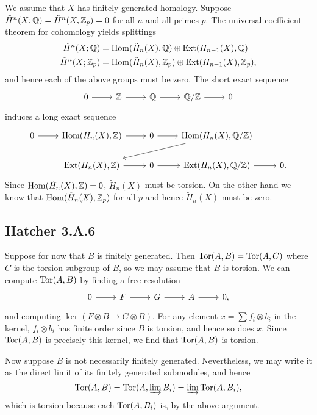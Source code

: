 \documentclass{../mathnotes}
\begin{document}
We assume that $X$ has finitely generated homology.
Suppose $\tilde H^n(X;\mathbb{Q})=\tilde H^n(X,\mathbb{Z}_p)=0$ for all $n$ and all primes $p$. The
universal coefficient theorem for cohomology yields splittings
\begin{align*}
    \tilde H^n(X;\mathbb{Q}) &= \operatorname{Hom}(\tilde H_n(X),\mathbb{Q})\oplus \operatorname{Ext}(H_{n-1}(X),\mathbb{Q})\\
    \tilde H^n(X;\mathbb{Z}_p) &= \operatorname{Hom}(\tilde H_n(X),\mathbb{Z}_p)\oplus \operatorname{Ext}(H_{n-1}(X),\mathbb{Z}_p),
\end{align*}
and hence each of the above groups must be zero. The short exact sequence
\begin{equation*}
    \begin{tikzcd}
        0\ar{r} & \Z\ar{r} & \Q\ar{r} & \Q/\Z\ar{r} & 0
    \end{tikzcd}
\end{equation*}
induces a long exact sequence
\begin{equation*}
    \begin{tikzcd}
        0\ar{r} & \Hom(\tilde H_n(X),\Z)\ar{r} & 0\ar{r} & \Hom(\tilde H_n(X),\Q/\Z)\ar{dll}\\
        &\Ext(H_n(X),\Z)\ar{r} & 0\ar{r} & \Ext(H_n(X),\Q/\Z)\ar{r} & 0.
    \end{tikzcd}
\end{equation*}
Since $\operatorname{Hom}(\tilde H_n(X),\mathbb{Z})=0$, $\tilde H_n(X)$ must be torsion. On the other hand we know that
$\operatorname{Hom}(\tilde H_n(X), \mathbb{Z}_p)$ for all $p$ and hence $\tilde H_n(X)$ must be zero.

\subsection*{Hatcher 3.A.6}

Suppose for now that $B$ is finitely generated. Then $\operatorname{Tor}(A,B)=\operatorname{Tor}(A,C)$ where $C$ is the torsion
subgroup of $B$, so we may assume that $B$ is torsion. We can compute $\operatorname{Tor}(A,B)$ by finding
a free resolution
\begin{equation*}
    \begin{tikzcd}
        0\ar{r} & F\ar{r} & G\ar{r} & A\ar{r} & 0,
    \end{tikzcd}
\end{equation*}
and computing $\ker\left(F\otimes B\to G\otimes B\right)$. For any element $x=\sum f_i\otimes b_i$ in
the kernel, $f_i\otimes b_i$ has finite order since $B$ is torsion, and hence so does $x$. Since
$\operatorname{Tor}(A,B)$ is precisely this kernel, we find that $\operatorname{Tor}(A,B)$ is torsion.

Now suppose $B$ is not necessarily finitely generated. Nevertheless, we may write it as the direct
limit of its finitely generated submodules, and hence 
\[\operatorname{Tor}(A,B)=\operatorname{Tor}(A,\varinjlim B_i)=\varinjlim\operatorname{Tor}(A,B_i),\]
which is torsion because each $\operatorname{Tor}(A,B_i)$ is, by the above argument.
\end{document}

